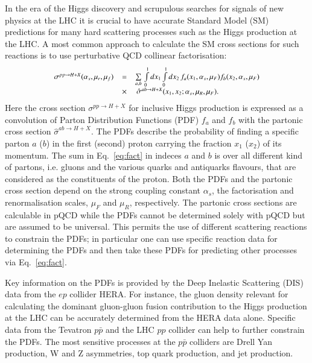 In the era of the Higgs discovery and scrupulous searches
for signals of new physics at the LHC it is crucial
to have accurate Standard Model (SM) predictions for
many hard scattering processes such as the Higgs production at the LHC.
A most common approach to calculate the SM cross sections for  
such reactions is to use perturbative QCD collinear factorisation:
\begin{equation}
\small
\begin{array}{lcl}
\sigma^{pp\rightarrow H + X}(\alpha_s,\mu_r,\mu_f) & = &
\sum\limits_{a,b}\,  \int\limits_{0}\limits^{1} dx_1 \int\limits_{0}\limits^{1} dx_2\, f_a(x_1,\alpha_s,\mu_F) 
 f_b(x_2,\alpha_s,\mu_F)\\ 
& \times & \, \hat{\sigma}^{ab \rightarrow H + X}(x_1,x_2;\alpha_s,\mu_R,\mu_F).
\label{eq:fact}
\end{array}
\end{equation}
Here the cross section $\sigma^{pp\rightarrow H + X}$ for inclusive
Higgs production is expressed
as a convolution of Parton Distribution Functions (PDF) $f_a$ and $f_b$
with the partonic cross section
$\hat{\sigma}^{ab \rightarrow H + X}$.
%
The PDFs describe 
the probability of finding a specific parton $a$ ($b$) in the first (second) proton carrying the fraction $x_1$ ($x_2$) of its momentum.
%
The sum in Eq.~\ref{eq:fact} in indeces $a$ and $b$ is over all different kind of partons,
i.e. gluons and the various quarks and antiquarks flavours, that are considered
as the constituents of the proton.
%
Both the PDFs and the partonic cross section depend on the strong coupling
constant $\alpha_s$, the factorisation and renormalisation scales,
$\mu_F$ and $\mu_R$, respectively.
%
The partonic cross sections are calculable in pQCD while
the PDFs cannot be determined solely with pQCD but are assumed 
to be universal.
%
This permits the use of different scattering reactions 
to constrain the PDFs; in particular one can use specific reaction data 
for determining the PDFs and then take these PDFs for
predicting other processes via Eq.~\ref{eq:fact}.
%

Key information on the PDFs is provided by the Deep Inelastic Scattering (DIS) data from the $ep$ collider HERA.
%
For instance, the gluon density relevant
for calculating the dominant gluon-gluon fusion contribution to the Higgs production
at the LHC can be accurately determined from the HERA data alone.
%
Specific data from the Tevatron $p\bar{p}$ and the LHC $pp$ collider
can help to further constrain the PDFs.
%
The most sensitive processes at the  $p\bar{p}$ colliders are
Drell Yan production, W and Z asymmetries, top quark production, and jet production.
%

